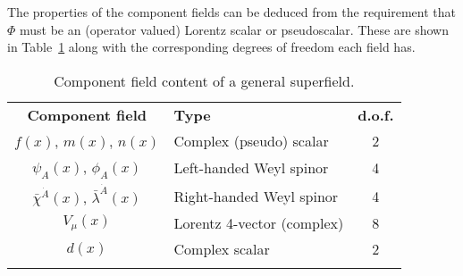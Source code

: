 \documentclass[notes.tex]{subfiles}
\begin{document}
The properties of the component fields can be deduced from the requirement that $\Phi$ must be an (operator valued) Lorentz scalar or pseudoscalar. These are shown in Table~\ref{tab:gensup} along with the corresponding degrees of freedom each field has.
\begin{table}
\begin{center}
   \begin{tabular}{c |l| c} 
   \noalign{\smallskip}\hline\noalign{\smallskip}
   {\bf Component field} & {\bf Type} & {\bf d.o.f.} \\
   \noalign{\smallskip}\hline\noalign{\smallskip}
   $f(x)$, $m(x)$, $n(x)$ & Complex (pseudo) scalar & 2\\
   $\psi_A(x)$, $\phi_A(x)$ & Left-handed Weyl spinor & 4\\
   $\bar{\chi}^{\dot{A}}(x)$, $\bar{\lambda}^{\dot{A}}(x)$ &Right-handed Weyl spinor& 4\\
   $V_\mu(x)$ & Lorentz 4-vector (complex) & 8\\
   $d(x)$ & Complex scalar & 2 \\
   \noalign{\smallskip}\hline\noalign{\smallskip}
    \end{tabular}
   \caption{Component field content of a general superfield. \label{tab:gensup}}
\end{center}
\end{table}
\end{document}
